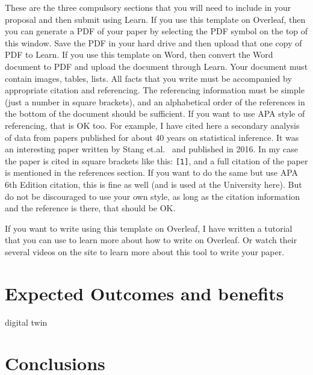 \documentclass[a4paper]{article}
\begin{document}
These are the three compulsory sections that you will need to include in your proposal and then submit using Learn. If you use this template on Overleaf, then you can generate a PDF of your paper by selecting the PDF symbol on the top of this window. Save the PDF in your hard drive and then upload that one copy of PDF to Learn. If you use this template on Word, then convert the Word document to PDF and upload the document through Learn. Your document must contain images, tables, lists. All facts that you write must be accompanied by appropriate citation and referencing. The referencing information must be simple (just a number in square brackets), and an alphabetical order of the references in the bottom of the document should be sufficient. If you want to use APA style of referencing, that is OK too. For example, I have cited here a secondary analysis of data from papers published for about 40 years on statistical inference. It was an interesting paper written by Stang et.al.~\cite{masarati2013formulation} and published in 2016. In my case the paper is cited in square brackets like this: \texttt{[1]}, and a full citation of the paper is mentioned in the references section. If you want to do the same but use APA 6th Edition citation, this is fine as well (and is used at the University here). But do not be discouraged to use your own style, as long as the citation information and the reference is there, that should be OK. 

If you want to write using this template on Overleaf, I have written a tutorial that you can use to learn more about how to write on Overleaf. Or watch their several videos on the site to learn more about this tool to write your paper. 


\section*{Expected Outcomes and benefits}


digital twin


%

\section*{Conclusions}


\printbibliography
\end{document}
